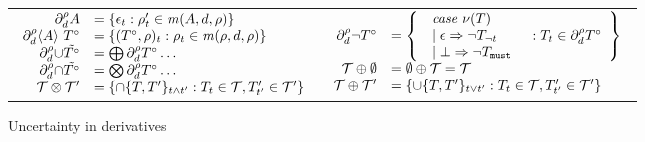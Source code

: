\begin{figure}
  \begin{tabular}{lr}
    $\begin{array}{rl}
    \derivee{\mdata}{\mevent}{\menv} &= 
      \setbuild{\epsilon_\mvaluation}{\menv'_\mvaluation \in \matches(\mevent, \mdata, \menv)} \\
%
    \derivee{\mdata}{\stbind{\mevent}{\motcon}}{\menv} &=
      \setbuild{(\motcon,\menv)_\mvaluation}{\menv_\mvaluation \in \matches(\menv,\mdata,\menv)} \\
%
    \derivee{\mdata}{\stOr{\isset{\motcon}}}{\menv} &= \bigoplus \derivee{\mdata}{\motcon}{\menv}\ldots \\
%
    \derivee{\mdata}{\stAnd{\isset{\motcon}}}{\menv} &= \bigotimes \derivee{\mdata}{\motcon}{\menv}\ldots \\
%
    \mtcons \otimes \mtcons' &= \setbuild{\stAnd{\setof{\mtcon,\mtcon'}}_{\mvaluation \wedge \mvaluation'}}{\mtcon_\mvaluation \in \mtcons, \mtcon'_{\mvaluation'} \in \mtcons'}
  \end{array}$
  &
  $\begin{array}{rl}
    \derivee{\mdata}{\stnot{\motcon}}{\menv} &=
     \left\{
       \begin{array}{ll}
         \begin{array}{l}
           \mathit{case}\ \nullable(\mtcon) \\
           \alt \epsilon \Rightarrow \stnot{\mtcon}_{\neg \mvaluation} \\
           \alt \bot \Rightarrow \stnot{\mtcon}_\must
         \end{array}
         &: \mtcon_\mvaluation \in \derivee{\mdata}{\motcon}{\menv}
       \end{array}
       \right\}
\\
    \mtcons \oplus \emptyset &= \emptyset \oplus \mtcons = \mtcons \\
%
    \mtcons \oplus \mtcons' &= \setbuild{\stOr{\setof{\mtcon,\mtcon'}}_{\mvaluation \vee \mvaluation'}}{\mtcon_\mvaluation \in \mtcons, \mtcon'_{\mvaluation'} \in \mtcons'} \\
%
  \end{array}$
  \end{tabular}
  \caption{Uncertainty in derivatives}
  \label{fig:abstract-tcon}
\end{figure}

